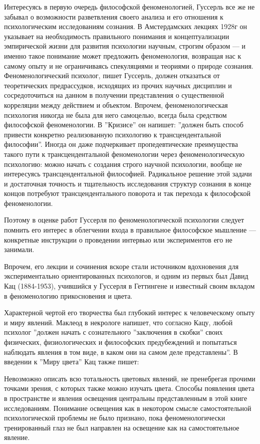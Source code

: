 \documentclass[11pt]{book}
\begin{document}
Интересуясь в первую очередь философской феноменологией, Гуссерль все же не забывал о возможности разветвления своего анализа и его отношения к психологическим исследованиям сознания. В Амстердамских лекциях 1928г он указывает на необходимость правильного понимания и концептуализации эмпирической жизни для развития психологии научным, строгим образом --- и именно такое понимание может предложить феноменология, возвращая нас к самому опыту и не ограничиваясь спекуляциями и теориями о природе сознания. Феноменологический психолог, пишет Гуссерль, должен отказаться от теоретических предрассудков, исходящих из прочих научных дисциплин и сосредоточиться на данном в получении представления о существенной корреляции между действием и объектом. Впрочем, феноменологическая психология никогда не была для него самоцелью, всегда была средством философской феноменологии. В ''Кризисе'' он напишет: ''должен быть способ привести конкретно реализованную психологию к трансцендентальной философии''. Иногда он даже подчеркивает пропедевтические преимущества такого пути к трансцендентальной феноменологии через феноменологическую психологию: можно начать с создания строго научной психологии, вообще не интересуясь трансцендентальной философией. Радикальное решение этой задачи и достаточная точность и тщательность исследования структур сознания в конце концов потребуют трансцендентального поворота и так перехода к философской феноменологии.

Поэтому в оценке работ Гуссерля по феноменологической психологии следует помнить его интерес в облегчении входа в правильное философское мышление --- конкретные инструкции о проведении интервью или экспериментов его не занимали.

Впрочем, его лекции и сочинения вскоре стали источником вдохновения для экспериментально ориентированных психологов, и одним из первых был Давид Кац (1884-1953), учившийся у Гуссерля в Геттингене и известный своим вкладом в феноменологию прикосновения и цвета.

Характерной чертой его творчества был глубокий интерес к человеческому опыту и миру явлений. Маклеод в некрологе напишет, что согласно Кацу, любой психолог ''должен начать с сознательного ''заключения в скобки'' своих физических, физиологических и философских предубеждений и попытаться наблюдать явления в том виде, в каком они на самом деле представлены''. В введении к ''Миру цвета'' Кац также пишет:

\smallskip
{}\relax
{}\relax

Невозможно описать всю тотальность цветовых явлений, не пренебрегая прочими точками зрения, с которых также можно изучать цвета. Способы появления цвета в пространстве и явления освещения центральны представленным в этой книге исследованиям. Понимание освещения как в некотором смысле самостоятельной психологической проблемы не было признано, пока феноменологически тренированный глаз не был направлен на освещение как на самостоятельное явление.
\end{document}
